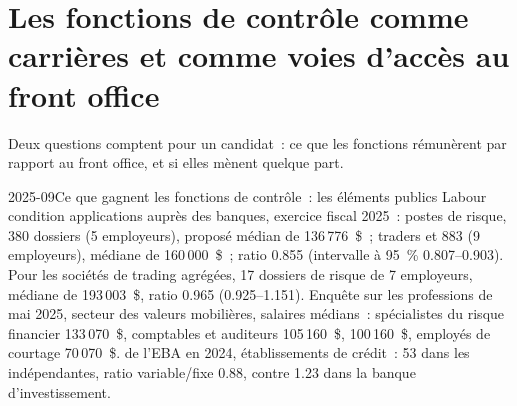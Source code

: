 \section{Les fonctions de contrôle comme carrières et comme voies d'accès au front office}

Deux questions comptent pour un candidat~: ce que les fonctions rémunèrent par rapport au front office, et si elles mènent quelque part.

\begin{dated}{2025-09}{Ce que gagnent les fonctions de contrôle~: les éléments publics}\label{dat:in:risk-operations-product-control-and-compliance:pay}
Labour condition applications auprès des banques, exercice fiscal 2025~: postes de risque, 380 dossiers (5 employeurs),  proposé médian
de 136\,776~\$~; traders et  883 (9 employeurs), médiane de 160\,000~\$~; ratio 0.855 (intervalle à 95~\%
0.807--0.903). Pour les sociétés de trading agrégées, 17 dossiers de risque de 7 employeurs, médiane de 193\,003~\$, ratio 0.965
(0.925--1.151). Enquête sur les professions de mai 2025, secteur des valeurs mobilières, salaires médians~: spécialistes du risque financier 133\,070~\$,
comptables et auditeurs 105\,160~\$,  100\,160~\$, employés de courtage 70\,070~\$.  de l'EBA en 2024,
établissements de crédit~: 53 dans les  indépendantes, ratio variable/fixe 0.88, contre 1.23 dans la
banque d'investissement.
\end{dated}


